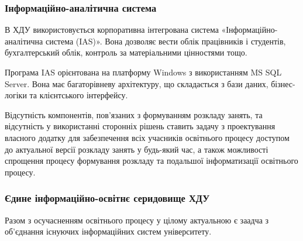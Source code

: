 \subsubsection{Інформаційно-аналітична система} \label{subs:ias}

В ХДУ використовується корпоративна інтегрована система «Інформаційно-аналітична система (IAS)». Вона дозволяє вести облік працівників і студентів, бухгалтерський облік, контроль за матеріальними цінностями тощо. 
		
Програма IAS орієнтована на платформу Windows з використанням MS SQL Server. Вона має багаторівневу архітектуру, що складається з бази даних, бізнес-логіки та клієнтського інтерфейсу.

Відсутність компонентів, пов’язаних з формуванням розкладу занять, та відсутність у використанні сторонніх рішень ставить задачу з проектування власного додатку для забезпечення всіх учасників освітнього процесу доступом до актуальної версії розкладу занять у будь-який час, а також можливості спрощення процесу формування розкладу та подальшої інформатизації освітнього процесу.

\subsubsection{Єдине інформаційно-освітнє серидовище ХДУ}

Разом з осучасненням освітнього процесу у цілому актуальною є заадча з об'єднання існуючих інформаційних систем університету.

